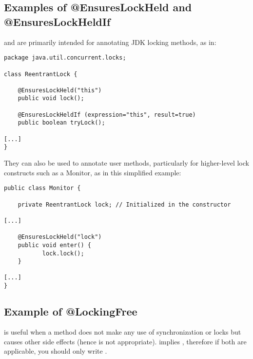 \subsection{Examples of @EnsuresLockHeld and @EnsuresLockHeldIf\label{ensureslockheld-examples}}

 and  are primarily intended
for annotating JDK locking methods, as in:

\begin{Verbatim}
package java.util.concurrent.locks;

class ReentrantLock {

    @EnsuresLockHeld("this")
    public void lock();

    @EnsuresLockHeldIf (expression="this", result=true)
    public boolean tryLock();

[...]
}
\end{Verbatim}

They can also be used to annotate user methods, particularly for
higher-level lock constructs such as a Monitor, as in this simplified example:

\begin{Verbatim}
public class Monitor {

    private ReentrantLock lock; // Initialized in the constructor

[...]

    @EnsuresLockHeld("lock")
    public void enter() {
           lock.lock();
    }

[...]
}
\end{Verbatim}

\subsection{Example of @LockingFree\label{lockingfree-example}}

 is useful when a method does not make any use of synchronization
or locks but causes other side effects (hence  is not appropriate).
 implies , therefore if both are applicable,
you should only write .


